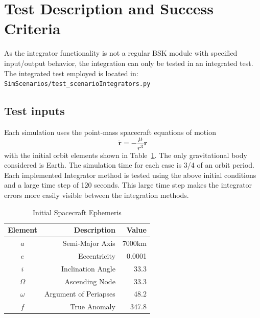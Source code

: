 
\section{Test Description and Success Criteria}

As the integrator functionality is not a regular BSK module with specified input/output behavior, the integration can only be tested in an integrated test.  
The integrated test employed is located in:\\

{\tt SimScenarios/test\_scenarioIntegrators.py}
\\

\subsection{Test inputs}
Each simulation uses the point-mass spacecraft equations of motion
\begin{equation}
	\ddot{\bm r} = - \frac{\mu}{r^{3}}{\bm r}
\end{equation}
with the initial orbit elements shown in Table~\ref{tbl:oeInitial}.  The only gravitational body considered is Earth.  The simulation time for each case is 3/4 of an orbit period.  Each implemented Integrator method is tested using the above initial conditions and a large time step of 120 seconds.  This large time step makes the integrator errors more easily visible between the integration methods.  


\begin{table}[htbp]
	\caption{Initial Spacecraft Ephemeris}
	\label{tbl:oeInitial}
	\centering \fontsize{10}{10}\selectfont
	\begin{tabular}{c | r | r } %
		\hline 
		\hline 
		Element    & Description & Value \\
		\hline 
		$a$      & Semi-Major Axis & 7000km \\
		$e$ & Eccentricity     &  0.0001 \\
		$i$       & Inclination Angle  & 33.3\dg \\
		$\Omega$       & Ascending Node   & 33.3\dg \\
		$\omega$       & Argument of Periapses  & 48.2\dg \\
		$f$       & True Anomaly   & 347.8\dg \\
		\hline
		\hline
	\end{tabular}
\end{table}



